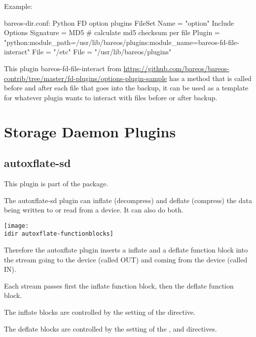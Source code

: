Example:

\begin{bconfig}{bareos-dir.conf: Python FD option plugins}
FileSet {
  Name = "option"
  Include {
    Options {
      Signature = MD5 # calculate md5 checksum per file
      Plugin = "python:module_path=/usr/lib/bareos/plugins:module_name=bareos-fd-file-interact"
    }
    File = "/etc"
    File = "/usr/lib/bareos/plugins"
  }
}
\end{bconfig}

This plugin bareos-fd-file-interact from \url{https://github.com/bareos/bareos-contrib/tree/master/fd-plugins/options-plugin-sample} has a method that is called before and after each file that goes into the backup,
it can be used as a template for whatever plugin wants to interact with files before or after backup.



\section{Storage Daemon Plugins}
\label{sdPlugins}

\subsection{autoxflate-sd}
\label{plugin-autoxflate-sd}


This plugin is part of the  package.

The autoxflate-sd plugin can inflate (decompress) and deflate (compress)
the data being written to or read from a device. It can also do both.

\begin{center}
\texttt{[image: \\idir autoxflate-functionblocks]}
\end{center}

Therefore the autoxflate plugin inserts a inflate and a deflate function block
into the stream going to the device (called OUT) and coming from the device (called IN).

Each stream passes first the inflate function block, then the deflate function block.

The inflate blocks are controlled by the setting of the  directive.

The deflate blocks are controlled by the setting of the ,
 and  directives.

